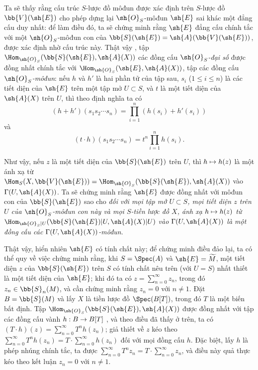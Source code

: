 \documentclass[oneside,10pt]{amsart}
\makeatletter
\renewcommand{\leq}{\leqslant}
\newcommand{\ega@arrow}[2]{\mathchoice{#1}{#2}{#2}{#2}}
\let\ega@shortmapsto\mapsto
\renewcommand{\to}{\ega@arrow{\longrightarrow}{\rightarrow}}
\renewcommand{\mapsto}{\ega@arrow{\longmapsto}{\ega@shortmapsto}}
\newcommand{\oldpage}[2][]{\marginnote{\normalfont\footnotesize\textbf{#1}~|~#2}\ignorespaces}
\let\EGAOriginalLabel\label
\renewcommand{\label}[1]{\phantomsection\EGAOriginalLabel{#1}}
\makeatother
\begin{document}
\begin{env}[1.7.14]
\label{II.1.7.14}
Ta sẽ thấy rằng cấu trúc $S$-lược đồ môđun được xác định trên $S$-lược đồ $\bb{V}(\sh{E})$ cho phép dựng lại $\sh{O}_S$-môđun $\sh{E}$ sai khác một đẳng cấu duy nhất: để làm điều đó, ta sẽ chứng minh rằng $\sh{E}$ đẳng cấu chính tắc với một $\sh{O}_S$-môđun con của $\bb{S}(\sh{E})=\sh{A}(\bb{V}(\sh{E}))$, được xác định nhờ cấu trúc này.
Thật vậy , tập $\Hom_{\sh{O}_S}(\bb{S}(\sh{E}),\sh{A}(X))$ các đồng cấu \emph{$\sh{O}_S$-đại số} được đồng nhất chính tắc với $\Hom_{\sh{O}_S}(\sh{E},\sh{A}(X))$, tập các đồng cấu \emph{$\sh{O}_S$-môđun}: nếu $h$ và $h'$ là hai phần tử của tập sau, $s_i$ ($1\leq i\leq n$) là các tiết diện của $\sh{E}$ trên một tập mở $U\subset S$, và $t$ là một tiết diện của $\sh{A}(X)$ trên $U$, thì theo định nghĩa ta có
\[
  (h+h')(s_1s_2\cdots s_n)=\prod_{i=1}^n(h(s_i)+h'(s_i))
\]
và
\[
  (t\cdot h)(s_1s_2\cdots s_n)=t^n\prod_{i=1}^n h(s_i).
\]

Như vậy, nếu $z$ là một tiết diện của $\bb{S}(\sh{E})$ trên $U$, thì $h\mapsto h(z)$ là một ánh xạ từ $\Hom_S(X,\bb{V}(\sh{E}))=\Hom_{\sh{O}_S}(\bb{S}(\sh{E}),\sh{A}(X))$ vào $\Gamma(U,\sh{A}(X))$.
Ta sẽ
\oldpage[II]{19}
chứng minh rằng $\sh{E}$ được đồng nhất với môđun con của $\bb{S}(\sh{E})$ sao cho \emph{đối với mọi tập mở $U\subset S$, mọi tiết diện $z$ trên $U$ của $\sh{O}_S$-môđun con này và mọi $S$-tiền lược đồ $X$, ánh xạ $h\mapsto h(z)$ từ $\Hom_{\sh{O}_S|U}(\bb{S}(\sh{E})|U,\sh{A}(X)|U)$ vào $\Gamma(U,\sh{A}(X))$ là một đồng cấu các $\Gamma(U,\sh{A}(X))$-môđun}.

Thật vậy, hiển nhiên $\sh{E}$ có tính chất này; để chứng minh điều đảo lại, ta có thể quy về việc chứng minh rằng, khi $S=\Spec(A)$ và $\sh{E}=\widetilde{M}$, một tiết diện $z$ của $\bb{S}(\sh{E})$ trên $S$ có tính chất nêu trên (với $U=S$) nhất thiết là một tiết diện của $\sh{E}$; khi đó ta có $z=\sum_{n=0}^{\infty}z_n$, trong đó $z_n\in\bb{S}_n(M)$, và cần chứng minh rằng $z_n=0$ với $n\neq1$.
Đặt $B=\bb{S}(M)$ và lấy $X$ là tiền lược đồ $\Spec(B[T])$, trong đó $T$ là một biến bất định.
Tập $\Hom_{\sh{O}_S}(\bb{S}(\sh{E}),\sh{A}(X))$ được đồng nhất với tập các đồng cấu vành $h:B\to B[T]$ , và theo điều đã thấy ở trên, ta có $(T\cdot h)(z)=\sum_{n=0}^{\infty}T^n h(z_n)$; giả thiết về $z$ kéo theo $\sum_{n=0}^{\infty}T^n h(z_n)=T\cdot\sum_{n=0}^{\infty}h(z_n)$ đối với mọi đồng cấu $h$.
Đặc biệt, lấy $h$ là phép nhúng chính tắc, ta được $\sum_{n=0}^{\infty}T^n z_n=T\cdot\sum_{n=0}^{\infty}z_n$, và điều này quả thực kéo theo kết luận $z_n=0$ với $n\neq1$.
\end{env}
\end{document}

